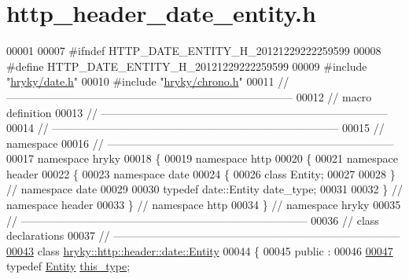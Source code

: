 \hypertarget{http__header__date__entity_8h_source}{\section{http\-\_\-header\-\_\-date\-\_\-entity.\-h}
}

\begin{DoxyCode}
00001 
00007 \textcolor{preprocessor}{#ifndef HTTP\_DATE\_ENTITY\_H\_20121229222259599}
00008 \textcolor{preprocessor}{}\textcolor{preprocessor}{#define HTTP\_DATE\_ENTITY\_H\_20121229222259599}
00009 \textcolor{preprocessor}{}\textcolor{preprocessor}{#include "\hyperlink{date_8h}{hryky/date.h}"}
00010 \textcolor{preprocessor}{#include "\hyperlink{chrono_8h}{hryky/chrono.h}"}
00011 \textcolor{comment}{//
      ------------------------------------------------------------------------------}
00012 \textcolor{comment}{// macro definition}
00013 \textcolor{comment}{//
      ------------------------------------------------------------------------------}
00014 \textcolor{comment}{//
      ------------------------------------------------------------------------------}
00015 \textcolor{comment}{// namespace}
00016 \textcolor{comment}{//
      ------------------------------------------------------------------------------}
00017 \textcolor{keyword}{namespace }hryky
00018 \{
00019 \textcolor{keyword}{namespace }http
00020 \{
00021 \textcolor{keyword}{namespace }header
00022 \{
00023 \textcolor{keyword}{namespace }date
00024 \{
00026     \textcolor{keyword}{class }Entity;
00027 
00028 \} \textcolor{comment}{// namespace date}
00029 
00030 \textcolor{keyword}{typedef} date::Entity date\_type;
00031 
00032 \} \textcolor{comment}{// namespace header}
00033 \} \textcolor{comment}{// namespace http}
00034 \} \textcolor{comment}{// namespace hryky}
00035 \textcolor{comment}{//
      ------------------------------------------------------------------------------}
00036 \textcolor{comment}{// class declarations}
00037 \textcolor{comment}{//
      ------------------------------------------------------------------------------}
\hypertarget{http__header__date__entity_8h_source_l00043}{}\hyperlink{classhryky_1_1http_1_1header_1_1date_1_1_entity}{00043} \textcolor{comment}{}\textcolor{keyword}{class }\hyperlink{classhryky_1_1http_1_1header_1_1date_1_1_entity}{hryky::http::header::date::Entity}
00044 \{
00045 \textcolor{keyword}{public} :
00046 
\hypertarget{http__header__date__entity_8h_source_l00047}{}\hyperlink{classhryky_1_1http_1_1header_1_1date_1_1_entity_added79307f2e97ca6c8e687bc56c7b5b}{00047}     \textcolor{keyword}{typedef} \hyperlink{classhryky_1_1http_1_1header_1_1date_1_1_entity}{Entity} \hyperlink{classhryky_1_1http_1_1header_1_1date_1_1_entity_added79307f2e97ca6c8e687bc56c7b5b}{this_type};

\end{DoxyCode}
